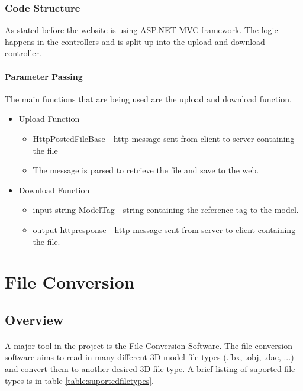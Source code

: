     \subsubsection{Code Structure}
    As stated before the website is using ASP.NET MVC framework. 
    The logic happens in the controllers and is split up into the upload and download controller.
    
    \paragraph{Parameter Passing}
    \hfill \break
    The main functions that are being used are the upload and download function.
    
    \begin{itemize}
        \item Upload Function
        \begin{itemize}
           \item HttpPostedFileBase - http message sent from client to server containing the file
           \item The message is parsed to retrieve the file and save to the web.
        \end{itemize}

        \item Download Function
        \begin{itemize}
            \item input string ModelTag - string containing the reference tag to the model.
            \item output httpresponse - http message sent from server to client containing the file. 
        \end{itemize}
    \end{itemize}



 \section{File Conversion}

    \subsection{Overview}
    \paragraph{}
    A major tool in the project is the File Conversion Software.  
    The file conversion software aims to read in many different 3D model file types (.fbx, .obj, .dae, ...) and convert them to another desired 3D file type.  
    A brief listing of suported file types is in table \ref{table:suportedfiletypes}.

